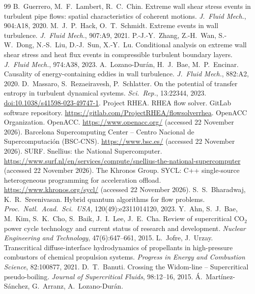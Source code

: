 \documentclass[11pt]{article}
\newcommand{\NEW}[1]{\iffinal #1\else{\color{red}#1}\fi}
\begin{document}
\begin{thebibliography}{99}
 B.\ Guerrero, M.\ F.\ Lambert, R.\ C.\ Chin. Extreme wall shear stress events in turbulent pipe flows: spatial characteristics of coherent motions. \emph{J.\ Fluid Mech.}, 904:A18, 2020.
 M.\ J.\ P.\ Hack, O.\ T.\ Schmidt. Extreme events in wall turbulence. \emph{J.\ Fluid Mech.}, 907:A9, 2021.
 P.-J.-Y.\ Zhang, Z.-H.\ Wan, S.-W.\ Dong, N.-S.\ Liu, D.-J.\ Sun, X.-Y.\ Lu. Conditional analysis on extreme wall shear stress and heat flux events in compressible turbulent boundary layers. \emph{J.\ Fluid Mech.}, 974:A38, 2023.
 A.\ Lozano-Dur\'an, H.\ J.\ Bae, M.\ P.\ Encinar. Causality of energy-containing eddies in wall turbulence. \emph{J.\ Fluid Mech.}, 882:A2, 2020.
 D.\ Massaro, S.\ Rezaeiravesh, P.\ Schlatter. On the potential of transfer entropy in turbulent dynamical systems. \emph{Sci.\ Rep.}, 13\NEW{:22344}, 2023. \href{https://doi.org/10.1038/s41598-023-49747-1}{doi:10.1038/s41598-023-49747-1}.
 Project RHEA. RHEA flow solver. GitLab software repository. \url{https://gitlab.com/ProjectRHEA/flowsolverrhea}.
 OpenACC Organization. OpenACC. \url{https://www.openacc.org/} (accessed 22 November 2026).
 Barcelona Supercomputing Center -- Centro Nacional de Supercomputaci\'on (BSC-CNS). \url{https://www.bsc.es/} (accessed 22 November 2026).
 SURF. Snellius: the National Supercomputer. \url{https://www.surf.nl/en/services/compute/snellius-the-national-supercomputer} (accessed 22 November 2026).
 The Khronos Group. SYCL: C++ single-source heterogeneous programming for acceleration offload. \url{https://www.khronos.org/sycl/} (accessed 22 November 2026).
 S.\ S.\ Bharadwaj, K.\ R.\ Sreenivasan. Hybrid quantum algorithms for flow problems. \emph{Proc.\ Natl.\ Acad.\ Sci.\ USA}, 120(49):e2311014120, 2023.
 Y.\ Ahn, S.\ J.\ Bae, M.\ Kim, S.\ K.\ Cho, S.\ Baik, J.\ I.\ Lee, J.\ E.\ Cha.
Review of supercritical CO$_2$ power cycle technology and current status of research and
development. \emph{Nuclear Engineering and Technology}, 47(6):647--661, 2015.
 L.\ Jofre, J.\ Urzay. Transcritical diffuse-interface hydrodynamics
of propellants in high-pressure combustors of chemical propulsion systems. \emph{Progress
in Energy and Combustion Science}, 82:100877, 2021.
 D.\ T.\ Banuti. Crossing the Widom-line -- Supercritical pseudo-boiling.
\emph{Journal of Supercritical Fluids}, 98:12--16, 2015.
 \'A.\ Mart\'inez-S\'anchez, G.\ Arranz, A.\ Lozano-Dur\'an.

\end{thebibliography}
\end{document}
